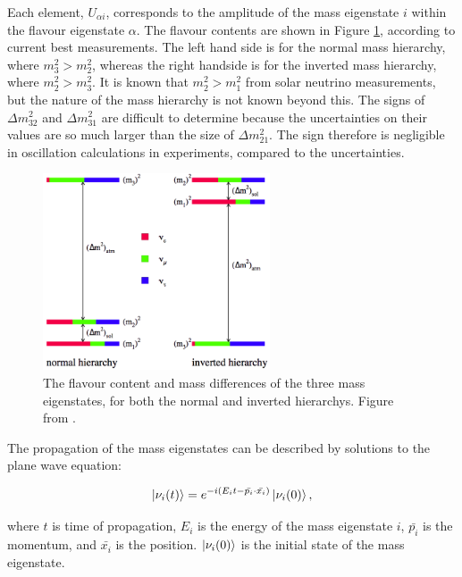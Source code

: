 Each element, $U_{\alpha i}$, corresponds to the amplitude of the mass eigenstate $i$ within the flavour eigenstate $\alpha$. The flavour contents are shown in Figure \ref{hierarchy}, according to current best measurements. The left hand side is for the normal mass hierarchy, where $m_3^2 > m_2^2$, whereas the right handside is for the inverted mass hierarchy, where $m_2^2 > m_3^2$. It is known that $m_2^2 > m_1^2$ from solar neutrino measurements, but the nature of the mass hierarchy is not known beyond this. The signs of $\Delta m_{32}^2$ and $\Delta m_{31}^2$ are difficult to determine because the uncertainties on their values are so much larger than the size of $\Delta m_{21}^2$. The sign therefore is negligible in oscillation calculations in experiments, compared to the uncertainties.

\begin{figure}[!htbp]
\vspace{20pt}
\centering
\includegraphics*[width=0.6\textwidth,clip]{figs/hierfig}
\caption{The flavour content and mass differences of the three mass eigenstates, for both the normal and inverted hierarchys. Figure from \cite{hierarchyplot}.} \label{hierarchy}
\end{figure}

The propagation of the mass eigenstates can be described by solutions to the plane wave equation:

\begin{equation}
\ket{\nu_{i}(t)}=e^{-i(E_{i}t-\bar{p_i}\cdot\bar{x_i})}\ket{\nu_i(0)},
\label{eqn:masspropagation}
\end{equation}

where $t$ is time of propagation, $E_i$ is the energy of the mass eigenstate $i$, $\bar{p_i}$ is the momentum, and $\bar{x_i}$ is the position. $\ket{\nu_i(0)}$ is the initial state of the mass eigenstate.

